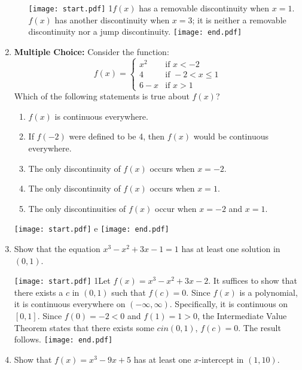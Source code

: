 \documentclass[12pt]{article}
\begin{document}
\begin{enumerate}
\begin{enumerate}
\texttt{[image: start.pdf]}
{{{1\linewidth}{$f(x)$ has a removable discontinuity when $x=1$.  $f(x)$ has another discontinuity when $x=3$; it is neither a removable discontinuity nor a jump discontinuity.}}}
\texttt{[image: end.pdf]}


\end{enumerate}

\item {\bf Multiple Choice:} Consider the function:$$f(x)=\begin{cases}
x^2 & \text{if }  x<-2\\
4 & \text{if }  -2<x\leq 1\\
6-x & \text{if }  x>1 \end{cases}$$  Which of the following statements is true about $f(x)$?

\begin{enumerate}

\item $f(x)$ is continuous everywhere.

\item If $f(-2)$ were defined to be 4, then $f(x)$ would be continuous everywhere.

\item The only discontinuity of $f(x)$ occurs when $x=-2$.

\item The only discontinuity of $f(x)$ occurs when $x=1$.

\item The only discontinuities of $f(x)$ occur when $x=-2$ and $x=1$.

\end{enumerate}

\texttt{[image: start.pdf]}
{{e}}
\texttt{[image: end.pdf]}


\item Show that the equation $x^3-x^2+3x-1=1$ has at least one solution in $(0,1)$. 

\texttt{[image: start.pdf]}
{{{1\linewidth}{Let $f(x) = x^3-x^2+3x-2$. It suffices to show that there exists a $c$ in $(0,1)$ such that $f(c)=0$.  Since $f(x)$ is a polynomial, it is continuous everywhere on $(-\infty,\infty)$.  Specifically, it is continuous on $[0,1]$.  Since $f(0)=-2<0$ and $f(1)=1>0$, the Intermediate Value Theorem states that there exists some $c in (0,1)$, $f(c)=0$.  The result follows.}}}
\texttt{[image: end.pdf]}


\item Show that $f(x)=x^3-9x+5$ has at least one $x$-intercept in $(1,10)$.


\end{enumerate}
\end{document}
